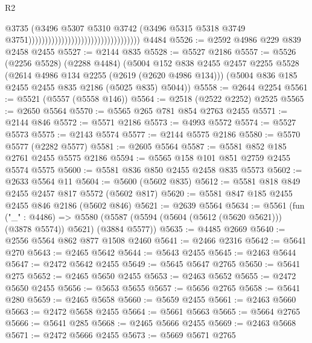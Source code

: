 \begin{lexlean}{R2}
\begin{coremodule}
                                                                    @3735
                                                                    (@3496
                                                                      @5307
                                                                      @5310
                                                                      @3742
                                                                      (@3496
                                                                        @5315
                                                                        @5318
                                                                        @3749
                                                                        @3751))))))))))))))))))))))))))))))))))
    @4484
@5526 := @2592 @4986 @229 @839 @2458 @2455
@5527 := @2144 @835
@5528 := @5527 @2186
@5557 := @5526
    (@2256 @5528)
    (@2288 @4484)
    (@5004
      @152
      @838
      @2455
      @2457
      @2255
      @5528
      (@2614 @4986 @134 @2255 (@2619 (@2620 @4986 @134)))
      (@5004 @836 @185 @2455 @2455 @835 @2186 (@5025 @835) @5044))
@5558 := @2644 @2254
@5561 := @5521 (@5557 (@5558 @146))
@5564 := @2518 (@2522 @2252) @2525
@5565 := @2650 @5564
@5570 := @5565 @265 @781 @854 @2763 @2455
@5571 := @2144 @846
@5572 := @5571 @2186
@5573 := @4993 @5572
@5574 := @5527 @5573
@5575 := @2143 @5574
@5577 := @2144 @5575 @2186
@5580 := @5570 @5577 (@2282 @5577)
@5581 := @2605 @5564
@5587 := @5581 @852 @185 @2761 @2455 @5575 @2186
@5594 := @5565 @158 @101 @851 @2759 @2455 @5574 @5575
@5600 := @5581 @836 @850 @2455 @2458 @835 @5573
@5602 := @2633 @5564 @11
@5604 := @5600 (@5602 @835)
@5612 := @5581 @818 @849 @2455 @2457 @817 @5572 (@5602 @817)
@5620 := @5581 @847 @185 @2455 @2455 @846 @2186 (@5602 @846)
@5621 := @2639 @5564
@5634 := @5561
    (fun ("_" : @4486) =>
    @5580 (@5587 (@5594 (@5604 (@5612 (@5620 @5621))) (@3878 @5574)) @5621) (@3884 @5577))
@5635 := @4485 @2669
@5640 := @2556 @5564 @862 @877 @1508 @2460
@5641 := @2466 @2316
@5642 := @5641 @270
@5643 := @2465 @5642
@5644 := @5643 @2455
@5645 := @2463 @5644
@5647 := @2472 @5642 @2455
@5649 := @5645 @5647 @2765
@5650 := @5641 @275
@5652 := @2465 @5650 @2455
@5653 := @2463 @5652
@5655 := @2472 @5650 @2455
@5656 := @5653 @5655
@5657 := @5656 @2765
@5658 := @5641 @280
@5659 := @2465 @5658
@5660 := @5659 @2455
@5661 := @2463 @5660
@5663 := @2472 @5658 @2455
@5664 := @5661 @5663
@5665 := @5664 @2765
@5666 := @5641 @285
@5668 := @2465 @5666 @2455
@5669 := @2463 @5668
@5671 := @2472 @5666 @2455
@5673 := @5669 @5671 @2765

\end{coremodule}
\end{lexlean}
